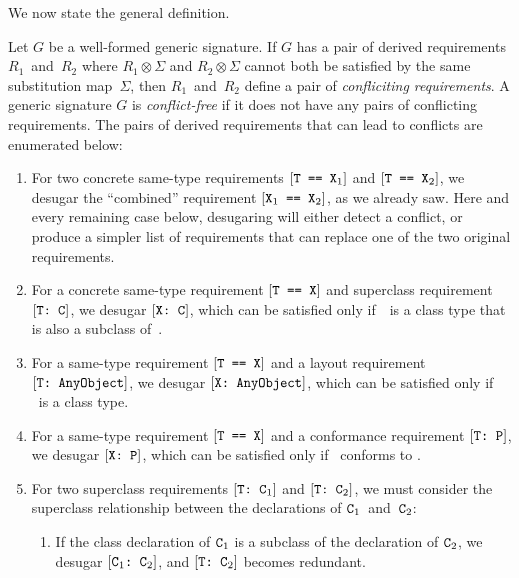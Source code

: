 \documentclass[../generics]{subfiles}
\begin{document}
We now state the general definition.

\begin{definition}\label{conflicting req def}
Let $G$ be a well-formed generic signature. If $G$ has a pair of derived requirements $R_1$~and~$R_2$ where $R_1\otimes\Sigma$ and $R_2\otimes\Sigma$ cannot both be satisfied by the same substitution map~$\Sigma$, then $R_1$~and~$R_2$ define a pair of \emph{confliciting requirements}. A generic signature $G$ is \emph{conflict-free} if it does not have any pairs of conflicting requirements. The pairs of derived requirements that can lead to conflicts are enumerated below:
\begin{enumerate}
\item For two concrete same-type requirements $[\texttt{T == $\texttt{X}_1$}]$ and $[\texttt{T == $\texttt{X}_2$}]$, we desugar the ``combined'' requirement $[\texttt{$\texttt{X}_1$ == $\texttt{X}_2$}]$, as we already saw. Here and every remaining case below, desugaring will either detect a conflict, or produce a simpler list of requirements that can replace one of the two original requirements.
\item For a concrete same-type requirement $[\texttt{T == X}]$ and superclass requirement $[\texttt{T:~C}]$, we desugar $[\texttt{X:~C}]$, which can be satisfied only if~\tX\ is a class type that is also a subclass of~\tC.
\item For a same-type requirement $[\texttt{T == X}]$ and a layout requirement $[\texttt{T:~AnyObject}]$, we desugar $[\texttt{X:~AnyObject}]$, which can be satisfied only if \tX\ is a class type.
\item For a same-type requirement $[\texttt{T == X}]$ and a conformance requirement $[\texttt{T:~P}]$, we desugar $[\texttt{X:~P}]$, which can be satisfied only if \tX\ conforms to \tP.
\item For two superclass requirements $[\texttt{T:~$\texttt{C}_1$}]$ and $[\texttt{T:~$\texttt{C}_2$}]$, we must consider the superclass relationship between the declarations of $\texttt{C}_1$~and~$\texttt{C}_2$:
\begin{enumerate}
\item If the class declaration of $\texttt{C}_1$ is a subclass of the declaration of $\texttt{C}_2$, we desugar $[\texttt{$\texttt{C}_1$:~$\texttt{C}_2$}]$, and $[\texttt{T:~$\texttt{C}_2$}]$ becomes redundant.

\end{enumerate}
\end{enumerate}
\end{definition}
\end{document}
